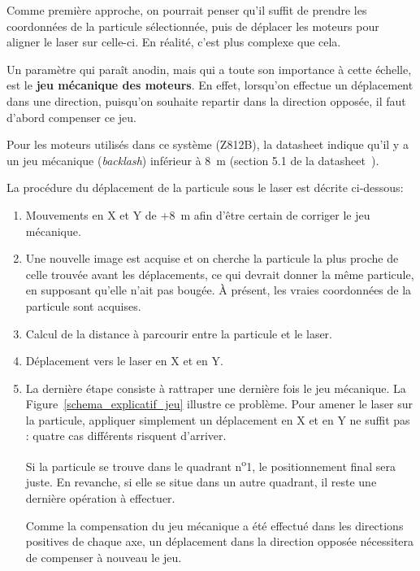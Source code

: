Comme première approche, on pourrait penser qu'il suffit de prendre les coordonnées de la particule sélectionnée, puis de déplacer les moteurs pour aligner le laser sur celle-ci. En réalité, c'est plus complexe que cela.

Un paramètre qui paraît anodin, mais qui a toute son importance à cette échelle, est le \textbf{jeu mécanique des moteurs}. En effet, lorsqu'on effectue un déplacement dans une direction, puisqu'on souhaite repartir dans la direction opposée, il faut d'abord compenser ce jeu.

Pour les moteurs utilisés dans ce système (Z812B), la datasheet indique qu'il y a un jeu mécanique (\textit{backlash}) inférieur à 8~\textmu m (section 5.1 de la datasheet~\cite{motorZ812B}).

La procédure du déplacement de la particule sous le laser est décrite ci-dessous:
\begin{enumerate}
    \item Mouvements en X et Y de +8~\textmu m afin d'être certain de corriger le jeu mécanique.
    \item Une nouvelle image est acquise et on cherche la particule la plus proche de celle trouvée avant les déplacements, ce qui devrait donner la même particule, en supposant qu'elle n'ait pas bougée. À présent, les vraies coordonnées de la particule sont acquises.
    \item Calcul de la distance à parcourir entre la particule et le laser.
    \item Déplacement vers le laser en X et en Y.
    \item
          La dernière étape consiste à rattraper une dernière fois le jeu mécanique. La Figure~\ref{schema_explicatif_jeu} illustre ce problème. Pour amener le laser sur la particule, appliquer simplement un déplacement en X et en Y ne suffit pas :  quatre cas différents risquent d'arriver.

          Si la particule se trouve dans le quadrant n\textsuperscript{o}1, le positionnement final sera juste. En revanche, si elle se situe dans un autre quadrant, il reste une dernière opération à effectuer.

          Comme la compensation du jeu mécanique a été effectué dans les directions positives de chaque axe, un déplacement dans la direction opposée nécessitera de compenser à nouveau le jeu.

\end{enumerate}

